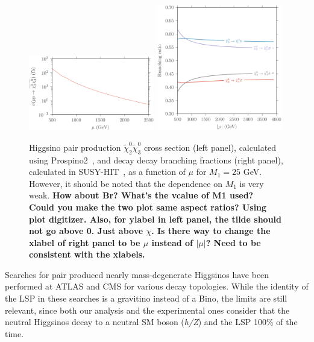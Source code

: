\documentclass[a4paper,11pt]{article}
\newcommand{\Shufang}[1]{{\bf\color{Maroon}  #1}}
\begin{document}
\begin{figure}[h]
  \centering
  \includegraphics[width=0.49\textwidth]{images/higgsino_production_xsection.png}
  \includegraphics[width=0.49\textwidth]{images/higgsino_br_plot.png}
  \caption{Higgsino pair production $\widetilde\chi_2^0\widetilde\chi_3^0$ cross section (left panel), calculated using Prospino2~\citep{Beenakker:1999xh},  and decay decay branching fractions (right panel), calculated in SUSY-HIT~\cite{Djouadi:2006bz},  as a function of $\mu$ for $M_1=25$ GeV. However, it
  should be noted that the dependence on $M_1$ is very weak.   \Shufang{How about Br? What's the vcalue of M1 used?}\\
  \Shufang{Could you make the two plot same aspect ratios? Using plot digitizer.  Also, for ylabel in left panel, the tilde should not go above 0.  Just above $\chi$.  Is there way to change the xlabel of right panel to be $\mu$ instead of $|\mu|$?  Need to be consistent with the xlabels.}}
  \label{fig:xsection_plot}
\end{figure}

Searches for pair produced nearly mass-degenerate Higgsinos  have been
performed at ATLAS and CMS for various decay  topologies. While the identity of
the LSP in these searches is a gravitino  instead of a Bino,   the limits are
still  relevant, since both  our analysis  and the experimental ones consider
that  the neutral Higgsinos decay to a  neutral SM boson (\emph{h/Z})  and the
LSP 100\% of the time.   
\end{document}
